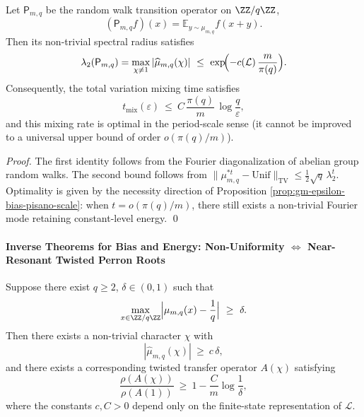 \begin{proposition}\label{prop:gm-random-walk-mixing-pisano}
Let \(\mathsf{P}_{m,q}\) be the random walk transition operator on \(\ZZ/q\ZZ\),
\[
(\mathsf{P}_{m,q}f)(x)=\mathbb{E}_{y\sim\mu_{m,q}}f(x+y).
\]
Then its non-trivial spectral radius satisfies
\[
\lambda_2(\mathsf{P}_{m,q})=\max_{\chi\neq 1}|\widehat\mu_{m,q}(\chi)|
\ \le\ \exp\!\Bigl(-c(\mathcal{L})\,\frac{m}{\pi(q)}\Bigr).
\]
Consequently, the total variation mixing time satisfies
\[
t_{\mathrm{mix}}(\varepsilon)\ \le\ C\,\frac{\pi(q)}{m}\,\log\!\frac{q}{\varepsilon},
\]
and this mixing rate is optimal in the period-scale sense (it cannot be improved to a universal upper bound of order \(o(\pi(q)/m)\)).
\end{proposition}

\begin{proof}
The first identity follows from the Fourier diagonalization of abelian group random walks.
The second bound follows from \(\|\mu_{m,q}^{\ast t}-\mathrm{Unif}\|_{\mathrm{TV}}\le \tfrac12\sqrt{q}\,\lambda_2^t\).
Optimality is given by the necessity direction of Proposition \ref{prop:gm-epsilon-bias-pisano-scale}: when \(t=o(\pi(q)/m)\), there still exists a non-trivial Fourier mode retaining constant-level energy. \qed
\end{proof}

\paragraph{Inverse Theorems for Bias and Energy: Non-Uniformity \texorpdfstring{$\Leftrightarrow$}{<->} Near-Resonant Twisted Perron Roots}
\begin{proposition}[Inverse Theorem for Modular Bias: Bias Lower Bound \texorpdfstring{$\Rightarrow$}{=>} Near-Resonant Twisted Perron Root]\label{prop:gm-mod-bias-inverse-near-resonance}
Suppose there exist \(q\ge 2\), \(\delta\in(0,1)\) such that
\[
\max_{x\in\ZZ/q\ZZ}\Bigl|\mu_{m,q}(x)-\frac1q\Bigr|\ \ge\ \delta.
\]
Then there exists a non-trivial character \(\chi\) with
\[
|\widehat\mu_{m,q}(\chi)|\ \ge\ c\,\delta,
\]
and there exists a corresponding twisted transfer operator \(A(\chi)\) satisfying
\[
\frac{\rho(A(\chi))}{\rho(A(1))}
\ \ge\
1-\frac{C}{m}\log\!\frac{1}{\delta},
\]
where the constants \(c,C>0\) depend only on the finite-state representation of \(\mathcal{L}\).
\end{proposition}

